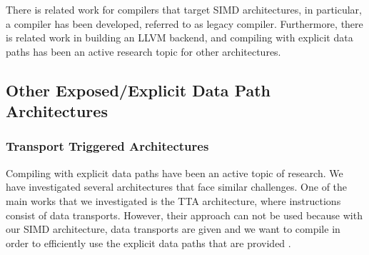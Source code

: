 



There is related work for compilers that target SIMD architectures, in particular, a compiler has been developed, referred to as legacy compiler. Furthermore, there is related work in building an LLVM backend, and compiling with explicit data paths has been an active research topic for other architectures.


\subsection{Other Exposed/Explicit Data Path Architectures}
\subsubsection{Transport Triggered Architectures}
Compiling with explicit data paths have been an active topic of research. We have investigated several architectures that face similar challenges. One of the main works that we investigated is the TTA architecture, where instructions consist of data transports. However, their approach can not be used because with our SIMD architecture, data transports are given and we want to compile in order to efficiently use the explicit data paths that are provided \cite{tta, tta_codegen}.

